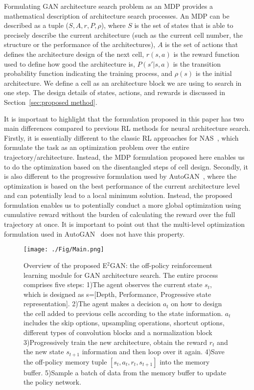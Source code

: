 \documentclass[runningheads]{llncs}
\begin{document}
Formulating GAN architecture search problem as an MDP provides a mathematical description of architecture search processes. An MDP can be described as a tuple ($S,A,r,P,\rho$), where $S$ is the set of states that is able to precisely describe the current architecture  (such as the current cell number, the structure or the performance of the architectures), $A$ is the set of actions that defines the architecture design of the next cell, $r (s,a)$ is the reward function used to define how good the architecture is, $P (s'|s,a)$ is the transition probability function indicating the training process, and  $\rho (s)$ is the initial architecture. We define a cell as an architecture block we are using to search in one step.  The design details of states, actions, and rewards is discussed in Section~\ref{sec:proposed method}. 

It is important to highlight that the  formulation proposed in this paper has two main differences compared to previous RL methods for neural architecture search. Firstly, it is essentially different to the classic RL approaches for NAS~\cite{zoph2016neural}, which formulate the task as an optimization problem over the entire trajectory/architecture. Instead, the MDP formulation proposed here enables us to do the optimization based on the disentangled steps of cell design. Secondly, it is also different to the progressive formulation used by AutoGAN~\cite{gong2019autogan}, where the optimization is based on the best performance of the current architecture level and can potentially lead to a local minimum solution. Instead, the proposed formulation enables us to potentially conduct a more global optimization using cumulative reward without the burden of calculating the reward over the full trajectory at once. It is important to point out that the multi-level optimization formulation used in AutoGAN~\cite{gong2019autogan} does not have this property. 



\begin{figure}[htbp]
    \centering
    \texttt{[image: ./Fig/Main.png]}
    \caption{Overview of the proposed E$^2$GAN: the off-policy reinforcement learning module for GAN architecture search. The entire process comprises five steps: 1)The agent observes the current state $s_t$, which is designed as  s=[Depth, Performance, Progressive state representation]. 2)The agent makes a decision $a_t$ on how to design the cell added to previous cells according to the state information.  $a_t$ includes the skip options, upsampling operations, shortcut options, different types of convolution blocks and a normalization block 3)Progressively train the new architecture, obtain the reward $r_t$ and the new state $s_{t+1}$ information and then loop over it again. 4)Save the off-policy memory tuple $[s_t,a_t,r_t,s_{t+1}]$ into the memory buffer. 5)Sample a batch of data from the memory buffer to update the policy network.}
\label{fig:main}
\end{figure}
\end{document}
